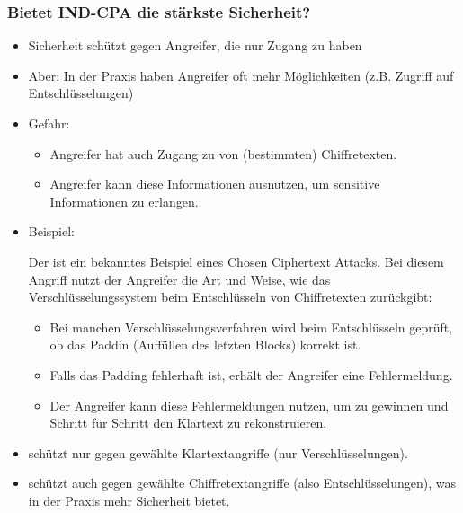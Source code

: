 \subsubsection*{Bietet IND-CPA die stärkste Sicherheit?}
\begin{itemize}
    \item {} Sicherheit schützt gegen Angreifer, die nur Zugang zu  haben
    \item Aber: In der Praxis haben Angreifer oft mehr Möglichkeiten (z.B. Zugriff auf Entschlüsselungen)
    \item Gefahr: 
    \begin{itemize}
        \item Angreifer hat auch Zugang zu  von (bestimmten) Chiffretexten.
        \item Angreifer kann diese Informationen ausnutzen, um sensitive Informationen zu erlangen.
    \end{itemize}
    \item Beispiel: 
    \begin{infoBox}
        Der  ist ein bekanntes Beispiel eines Chosen Ciphertext Attacks. Bei diesem Angriff nutzt der Angreifer die Art und Weise, wie das Verschlüsselungssystem  beim Entschlüsseln von Chiffretexten zurückgibt:
        \begin{itemize}
            \item Bei manchen Verschlüsselungsverfahren wird beim Entschlüsseln geprüft, ob das Paddin (Auffüllen des letzten Blocks) korrekt ist.
            \item Falls das Padding fehlerhaft ist, erhält der Angreifer eine Fehlermeldung.
            \item Der Angreifer kann diese Fehlermeldungen nutzen, um  zu gewinnen und Schritt für Schritt den Klartext zu rekonstruieren.
        \end{itemize}
    \end{infoBox}
\end{itemize}
\begin{infoBox}
    \begin{itemize}
        \item {} schützt nur gegen gewählte Klartextangriffe (nur Verschlüsselungen).
        \item {} schützt auch gegen gewählte Chiffretextangriffe (also Entschlüsselungen), was in der Praxis mehr Sicherheit bietet.
    \end{itemize}
\end{infoBox}

